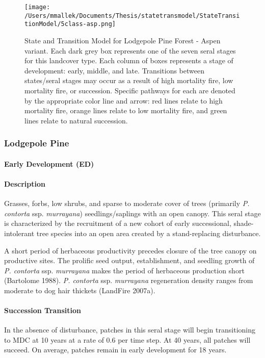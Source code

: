 \begin{figure}[htbp]
\centering
\texttt{[image: /Users/mmallek/Documents/Thesis/statetransmodel/StateTransitionModel/5class-asp.png]}
\caption{State and Transition Model for Lodgepole Pine Forest - Aspen variant. Each dark grey box represents one of the seven seral stages for this landcover type. Each column of boxes represents a stage of development: early, middle, and late. Transitions between states/seral stages may occur as a result of high mortality fire, low mortality fire, or succession. Specific pathways for each are denoted by the appropriate color line and arrow: red lines relate to high mortality fire, orange lines relate to low mortality fire, and green lines relate to natural succession.} 
\label{transmodel_lpn-asp}
\end{figure}


\subsubsection{Lodgepole Pine}

\paragraph{Early Development (ED)}

\paragraph{Description} Grasses, forbs, low shrubs, and sparse to moderate cover of trees (primarily \emph{P. contorta} ssp. \emph{murrayana}) seedlings/saplings with an open canopy. This seral stage is characterized by the recruitment of a new cohort of early successional, shade-intolerant tree species into an open area created by a stand-replacing disturbance. 


A short period of herbaceous productivity precedes closure of the tree canopy on productive sites. The prolific seed output, establishment, and seedling growth of \emph{P. contorta} ssp. \emph{murrayana} makes the period of herbaceous production short (Bartolome 1988). \emph{P. contorta} ssp. \emph{murrayana} regeneration density ranges from moderate to dog hair thickets (LandFire 2007a).


\paragraph{Succession Transition} In the absence of disturbance, patches in this seral stage will begin transitioning to MDC at 10 years at a rate of 0.6 per time step. At 40 years, all patches will succeed. On average, patches remain in early development for 18 years.

